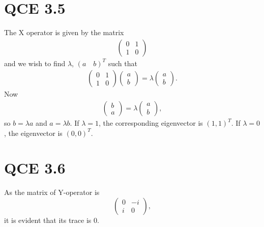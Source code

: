 \documentclass[10pt]{article}
\begin{document}
\section*{QCE 3.5}
The X operator is given by the matrix
\begin{align*}
\begin{pmatrix}
0 & 1 \\
1 & 0
\end{pmatrix}
\end{align*}
and we wish to find $\lambda$, $(a \quad b)^T$ such that
\begin{align*}
\begin{pmatrix}
0 & 1 \\
1 & 0
\end{pmatrix}
\begin{pmatrix}
a \\
b
\end{pmatrix} =
\lambda \begin{pmatrix}
a \\
b
\end{pmatrix}.
\end{align*}
Now
\begin{align*}
\begin{pmatrix}
b \\
a
\end{pmatrix} = \lambda \begin{pmatrix}
a \\
b
\end{pmatrix},
\end{align*}
so $b = \lambda a$ and $a = \lambda b$. If $\lambda = 1$, the corresponding eigenvector is $(1, 1)^T$. If $\lambda = 0$, the eigenvector is $(0, 0)^T$.

\section*{QCE 3.6}
As the matrix of Y-operator is
\[
\begin{pmatrix}
0 & -i \\
i & 0
\end{pmatrix},
\]
it is evident that its trace is 0.
\end{document}
